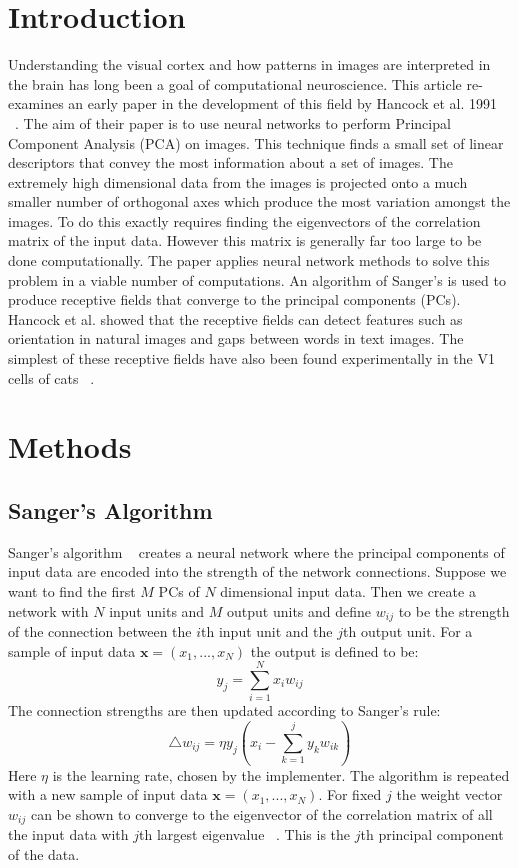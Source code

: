 \section{Introduction}

Understanding the visual cortex and how patterns in images are interpreted in the brain has long been a goal of computational neuroscience. This article re-examines an early paper in the development of this field by Hancock et al. 1991 ~\cite{Hancock}. 
The aim of their paper is to use neural networks to perform Principal Component Analysis (PCA) on images. This technique finds a small set of linear descriptors that convey the most information about a set of images. The extremely high dimensional data from the images is projected onto a much smaller number of orthogonal axes which produce the most variation amongst the images. To do this exactly requires finding the eigenvectors of the correlation matrix of the input data. However this matrix is generally far too large to be done computationally. The paper applies neural network methods to solve this problem in a viable number of computations. An algorithm of Sanger's is used to produce receptive fields that converge to the principal components (PCs).\\
Hancock et al. showed that the receptive fields can detect features such as orientation in natural images and gaps between words in text images. The simplest of these receptive fields have also been found experimentally in the V1 cells of cats ~\cite{Orban}.

\section{Methods}

\subsection{Sanger's Algorithm}

Sanger's algorithm ~\cite{Sanger} creates a neural network where the principal components of input data are encoded into the strength of the network connections. Suppose we want to find the first $M$ PCs of $N$ dimensional input data. Then we create a network with $N$ input units and $M$ output units and define $w_{ij}$ to be the strength of the connection between the $i$th input unit and the $j$th output unit. For a sample of input data $\textbf{x}=(x_1,...,x_N)$ the output is defined to be:
\[y_j=\sum^N_{i=1}x_iw_{ij}\]
The connection strengths are then updated according to Sanger's rule:
\[\triangle w_{ij}=\eta y_j(x_i-\sum^j_{k=1}y_k w_{ik})\]
Here $\eta$ is the learning rate, chosen by the implementer. The algorithm is repeated with a new sample of input data $\textbf{x}=(x_1,...,x_N)$. For fixed $j$ the weight vector $w_{ij}$ can be shown to converge to the eigenvector of the correlation matrix of all the input data with $j$th largest eigenvalue ~\cite{Sanger}. This is the $j$th principal component of the data.

